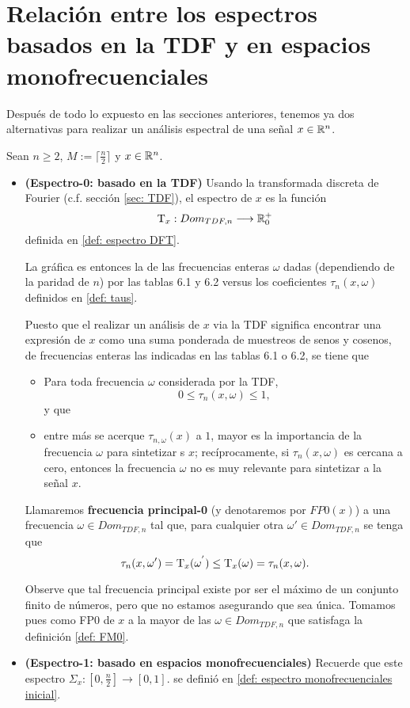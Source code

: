 \section{Relación entre los espectros basados en la TDF y en espacios monofrecuenciales}

Después de todo lo expuesto en las secciones anteriores, tenemos
ya dos alternativas para realizar un análisis
espectral de una señal $x \in \mathbb{R}^{n}$.

Sean $n \geq 2$, $M := \lceil \frac{n}{2} \rceil$ y $x \in \mathbb{R}^{n}$.
\begin{itemize}
	\item \textbf{(Espectro-0: basado en la TDF)} 
	Usando la transformada discreta de Fourier
	(c.f. sección \ref{sec: TDF}),
	el espectro de $x$ es la función
	\[
	\mathrm{T}_{x}: Dom_{TDF, n} \longrightarrow \mathbb{R}^{+}_{0}
	\]	
	definida en \ref{def: espectro DFT}.
	
	La gráfica es entonces la de las frecuencias
	enteras $\omega$ dadas (dependiendo de la 
	paridad de $n$) por las
	tablas 6.1 y 6.2
	versus los coeficientes
	$\tau_{n}(x, \omega)$ definidos en
	\ref{def: taus}.
	
	Puesto que el realizar un análisis de 
	$x$ via la TDF significa encontrar una
	expresión de $x$ como una suma
	ponderada de muestreos de senos y cosenos,
	de frecuencias enteras las indicadas en las tablas 6.1 o 6.2,
	se tiene que  
	\begin{itemize}
		\item Para toda frecuencia $\omega$ considerada
		por la TDF,
		\[
		0 \leq \tau_{n}(x, \omega) \leq 1,
		\]
		y que
		\item entre más se acerque
		$\tau_{n, \omega}(x)$
		a $1$, mayor es la
		importancia de la frecuencia $\omega$ para
		sintetizar s $x$; recíprocamente, si 
		$\tau_{n}(x, \omega)$ es cercana a cero, entonces
		la frecuencia $\omega$ no es muy relevante para 
		sintetizar a la señal $x$.
	\end{itemize}
	\begin{defi}
	\label{def: FM0}
	Llamaremos \textbf{frecuencia principal-0}
	(y denotaremos por $FP0(x)$) 
	a una 
	frecuencia $\omega \in Dom_{TDF, n}$
	tal que, para cualquier otra $\omega' \in Dom_{TDF, n}$ 
	se tenga que 
	\[
	\tau_{n}(x, \omega') = \mathrm{T}_{x}(\omega^{'}) \leq
	\mathrm{T}_{x}(\omega) =  
	 \tau_{n}(x, \omega).
	\]
	\end{defi}
	Observe que tal frecuencia principal existe por ser 
	el máximo de un conjunto finito de números, pero que no 
	estamos asegurando que sea única. Tomamos pues
	como FP0 de $x$ a la mayor de las $\omega \in Dom_{TDF, n}$ 
	que satisfaga la definición \ref{def: FM0}.
	\item \textbf{(Espectro-1: basado en espacios monofrecuenciales)} 
	Recuerde que este espectro 
	$
	\Sigma_{x} : \left[0, \frac{n}{2} \right] \longrightarrow [0,1].
	$
	se definió en \ref{def: espectro monofrecuenciales inicial}.
	

\end{itemize}
